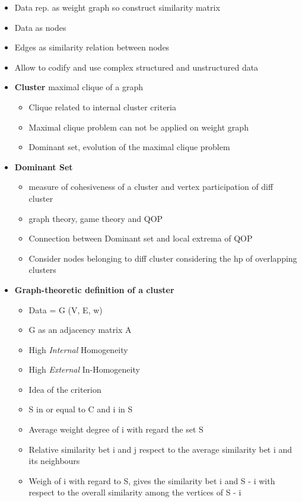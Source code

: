 \begin{itemize}
    \item Data rep. as weight graph so construct similarity matrix
    \item Data as nodes
    \item Edges as similarity relation between nodes
    \item Allow to codify and use complex structured and unstructured data
    \item \textbf{Cluster} maximal clique of a graph
    \begin{itemize}
        \item Clique related to internal cluster criteria
        \item Maximal clique problem can not be applied on weight graph
        \item Dominant set, evolution of the maximal clique problem
    \end{itemize}
    \item \textbf{Dominant Set}
    \begin{itemize}
        \item measure of cohesiveness of a cluster and vertex participation of diff cluster
        \item graph theory, game theory and QOP
        \item Connection between Dominant set and local extrema of QOP
        \item Consider nodes belonging to diff cluster considering the hp of overlapping clusters
    \end{itemize}
    \item \textbf{Graph-theoretic definition of a cluster}
    \begin{itemize}
        \item Data = G (V, E, w)
        \item G as an adjacency matrix A
        \item High \textit{Internal} Homogeneity
        \item High \textit{External} In-Homogeneity
        \item Idea of the criterion
        \item S in or equal to C and i in S
        \item Average weight degree of i with regard the set S
        \item Relative similarity bet i and j respect to the average similarity bet i and its neighbours
        \item Weigh of i with regard to S, gives the similarity bet i and S - i with respect to the overall similarity among the vertices of S - i

\end{itemize}
\end{itemize}
